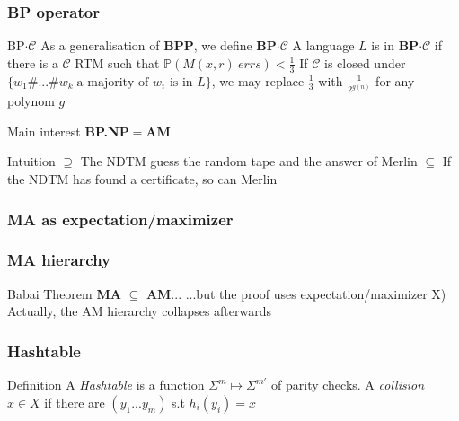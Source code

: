 \documentclass[pdf]{beamer}
\newcommand{\bb}[1]{\mathbb{#1}}
\newcommand{\mc}[1]{\mathcal{#1}} %
\begin{document}
\begin{frame}
\frametitle{BP operator}


\begin{block}{BP$\cdot\mc{C}$}
As a generalisation of \textbf{BPP}, we define \textbf{BP$\cdot \mc{C}$} \newline 
A language $L$ is in \textbf{BP$\cdot \mc{C}$} if there is a $\mc{C}$ RTM such that
$\bb{P}(M(x,r)~errs) < \frac{1}{3}$ \newline \newline
If $\mc{C}$ is closed under $\{w_1\#...\#w_k \vert \text{a majority of } w_i \text{ is in } L \}$, \newline
we may replace $\frac{1}{3}$ with $\frac{1}{2^{g(n)}}$ for any polynom $g$
\end{block}

\begin{alertblock}{Main interest}
\textbf{BP.NP}$=$\textbf{AM}
\end{alertblock}

\begin{exampleblock}{Intuition}
$\supseteq$ The NDTM guess the random tape and the answer of Merlin \newline
$\subseteq$ If the NDTM has found a certificate, so can Merlin \newline
\end{exampleblock}

\end{frame}


\begin{frame}
\frametitle{MA as expectation/maximizer}
\end{frame}

\begin{frame}
\frametitle{MA hierarchy}

\begin{alertblock}{Babai Theorem}
\textbf{MA} $\subseteq$ \textbf{AM}...\newline
...but the proof uses expectation/maximizer X) \newline
Actually, the AM hierarchy collapses afterwards
\end{alertblock}


\end{frame}
\begin{frame}
\frametitle{Hashtable}

\begin{block}{Definition}
A \emph{Hashtable} is a function $\Sigma^m \mapsto \Sigma^{m'}$ of parity checks. \newline
A \emph{collision} $x \in X$ if there are $(y_1...y_m)$ s.t $h_i(y_i)=x$
\end{block}


\end{frame}
\end{document}
